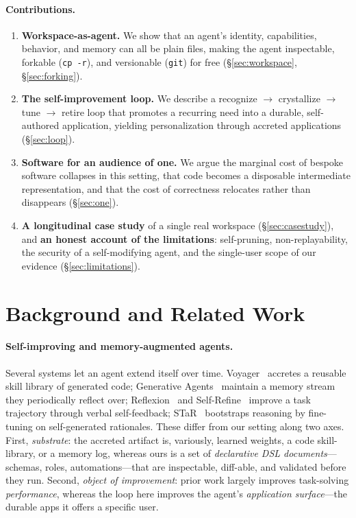 \documentclass[11pt]{article}
\newcommand{\code}[1]{\texttt{\small #1}}
\begin{document}
\paragraph{Contributions.}
\begin{enumerate}
  \item \textbf{Workspace-as-agent.} We show that an agent's identity, capabilities,
  behavior, and memory can all be plain files, making the agent inspectable,
  forkable (\code{cp -r}), and versionable (\code{git}) for free
  (\S\ref{sec:workspace}, \S\ref{sec:forking}).
  \item \textbf{The self-improvement loop.} We describe a recognize $\rightarrow$
  crystallize $\rightarrow$ tune $\rightarrow$ retire loop that promotes a recurring
  need into a durable, self-authored application, yielding personalization through
  accreted applications (\S\ref{sec:loop}).
  \item \textbf{Software for an audience of one.} We argue the marginal cost of
  bespoke software collapses in this setting, that code becomes a disposable
  intermediate representation, and that the cost of correctness relocates rather
  than disappears (\S\ref{sec:one}).
  \item \textbf{A longitudinal case study} of a single real workspace
  (\S\ref{sec:casestudy}), and \textbf{an honest account of the limitations}:
  self-pruning, non-replayability, the security of a self-modifying agent, and the
  single-user scope of our evidence (\S\ref{sec:limitations}).
\end{enumerate}

\section{Background and Related Work}
\label{sec:related}

\paragraph{Self-improving and memory-augmented agents.}
Several systems let an agent extend itself over time. Voyager~\citep{wang2023voyager}
accretes a reusable skill library of generated code; Generative
Agents~\citep{park2023generative} maintain a memory stream they periodically reflect
over; Reflexion~\citep{shinn2023reflexion} and Self-Refine~\citep{madaan2023selfrefine}
improve a task trajectory through verbal self-feedback; STaR~\citep{zelikman2022star}
bootstraps reasoning by fine-tuning on self-generated rationales. These differ from
our setting along two axes. First, \emph{substrate}: the accreted artifact is, variously,
learned weights, a code skill-library, or a memory log, whereas ours is a set of
\emph{declarative DSL documents}---schemas, roles, automations---that are
inspectable, diff-able, and validated before they run. Second, \emph{object of
improvement}: prior work largely improves task-solving \emph{performance}, whereas
the loop here improves the agent's \emph{application surface}---the durable apps it
offers a specific user.
\end{document}
